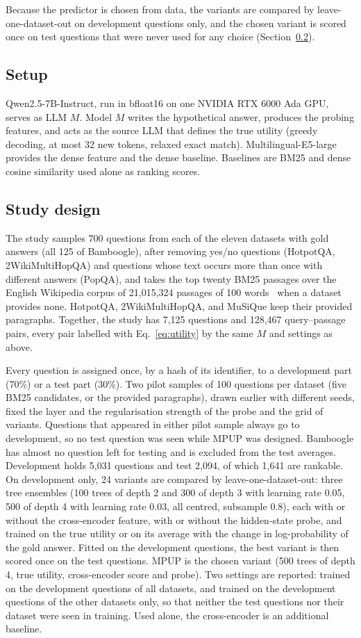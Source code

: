 \documentclass[conference]{IEEEtran}
\begin{document}
Because the predictor is chosen from data, the variants are compared by leave-one-dataset-out on development questions only, and the chosen variant is scored once on test questions that were never used for any choice (Section~\ref{sec:big}).

\subsection{Setup}
Qwen2.5-7B-Instruct, run in bfloat16 on one NVIDIA RTX 6000 Ada GPU, serves as LLM $M$. Model $M$ writes the hypothetical answer, produces the probing features, and acts as the source LLM that defines the true utility (greedy decoding, at most 32 new tokens, relaxed exact match). Multilingual-E5-large provides the dense feature and the dense baseline. Baselines are BM25 and dense cosine similarity used alone as ranking scores.

\subsection{Study design}\label{sec:big}
The study samples 700 questions from each of the eleven datasets with gold answers (all 125 of Bamboogle), after removing yes/no questions (HotpotQA, 2WikiMultiHopQA) and questions whose text occurs more than once with different answers (PopQA), and takes the top twenty BM25 passages over the English Wikipedia corpus of 21,015,324 passages of 100 words~\cite{karpukhin2020} when a dataset provides none. HotpotQA, 2WikiMultiHopQA, and MuSiQue keep their provided paragraphs. Together, the study has 7,125 questions and 128,467 query--passage pairs, every pair labelled with Eq.~\eqref{eq:utility} by the same $M$ and settings as above.

Every question is assigned once, by a hash of its identifier, to a development part (70\%) or a test part (30\%). Two pilot samples of 100 questions per dataset (five BM25 candidates, or the provided paragraphs), drawn earlier with different seeds, fixed the layer and the regularisation strength of the probe and the grid of variants. Questions that appeared in either pilot sample always go to development, so no test question was seen while MPUP was designed. Bamboogle has almost no question left for testing and is excluded from the test averages. Development holds 5,031 questions and test 2,094, of which 1,641 are rankable. On development only, 24 variants are compared by leave-one-dataset-out: three tree ensembles (100 trees of depth 2 and 300 of depth 3 with learning rate 0.05, 500 of depth 4 with learning rate 0.03, all centred, subsample 0.8), each with or without the cross-encoder feature, with or without the hidden-state probe, and trained on the true utility or on its average with the change in log-probability of the gold answer. Fitted on the development questions, the best variant is then scored once on the test questions. MPUP is the chosen variant (500 trees of depth 4, true utility, cross-encoder score and probe). Two settings are reported: trained on the development questions of all datasets, and trained on the development questions of the other datasets only, so that neither the test questions nor their dataset were seen in training. Used alone, the cross-encoder is an additional baseline.
\end{document}
